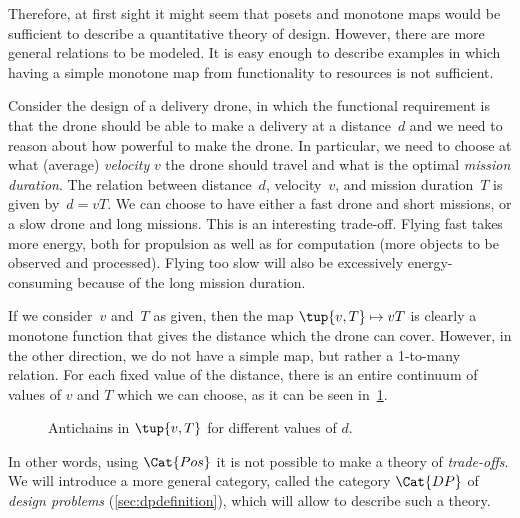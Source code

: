 \begin{comment}
\begin{figure}[h!]
    \centering
    \begin{tikzcd}
    \bullet &\arrow[l] \bullet\\[-15pt]
    \text{mass} & \text{capacity}
    \end{tikzcd}
    \caption{Example of the design of a battery. \label{fig:battery-example}}
\end{figure}
\end{comment}

Therefore, at first sight it might seem that posets and monotone maps
would be sufficient to describe a quantitative theory of design.
However, there are more general relations to be modeled. It is easy enough
to describe examples in which having a simple monotone map from functionality
to resources is not sufficient.

\begin{example}
Consider the design of a delivery drone, in which the functional
requirement is that the drone should be able to make a delivery
at a distance~$d$ and we need to reason about how powerful to make
the drone. In particular, we need to choose at what (average) \emph{velocity} $v$ the drone  should travel and what is the optimal \emph{mission duration}. The relation between distance~$d$, velocity~$v$, and mission duration~$T$ is given by~$d=vT$. We can choose to have either a fast drone and short missions, or a slow drone and long missions. This is an interesting trade-off. Flying fast takes more energy, both for propulsion as well as for computation (more objects to be observed and processed). Flying too slow will also be excessively energy-consuming because of the long mission duration.

If we consider~$v$ and~$T$ as given, then the map $\tup{v,T} \mapsto vT$ is clearly a monotone function that gives the distance which the drone can cover. However, in the other direction, we do not have a simple map, but rather a 1-to-many relation. For each fixed value of the distance, there is an entire continuum of values of $v$ and $T$ which we can choose, as it can be seen in~\cref{fig:drone-example-antichain}.

\begin{figure}[h!]
    \centering
    \caption{Antichains in $\tup{v,T}$ for different values of $d$. \label{fig:drone-example}
    \label{fig:drone-example-antichain}}
\end{figure}

\end{example}

In other words, using $\Cat{Pos}$ it is not possible to make a theory of \emph{trade-offs}. We will introduce a more general category, called  the category $\Cat{DP}$ of
\emph{design problems} (\cref{sec:dpdefinition}), which will allow to describe such a theory.
    

